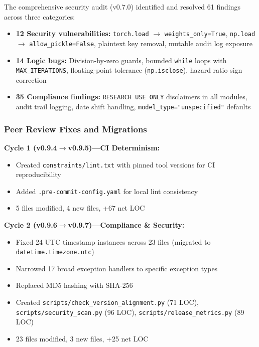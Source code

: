 \documentclass[10pt]{article}
\begin{document}
The comprehensive security audit (v0.7.0) identified and resolved 61 findings across three categories:
\begin{itemize}
  \item \textbf{12 Security vulnerabilities:} \texttt{torch.load} $\to$ \texttt{weights\_only=True}, \texttt{np.load} $\to$ \texttt{allow\_pickle=False}, plaintext key removal, mutable audit log exposure
  \item \textbf{14 Logic bugs:} Division-by-zero guards, bounded \texttt{while} loops with \texttt{MAX\_ITERATIONS}, floating-point tolerance (\texttt{np.isclose}), hazard ratio sign correction
  \item \textbf{35 Compliance findings:} \texttt{RESEARCH USE ONLY} disclaimers in all modules, audit trail logging, date shift handling, \texttt{model\_type="unspecified"} defaults
\end{itemize}

\subsubsection{Peer Review Fixes and Migrations}

\textbf{Cycle 1 (v0.9.4$\to$v0.9.5)---CI Determinism:}
\begin{itemize}
  \item Created \texttt{constraints/lint.txt} with pinned tool versions for CI reproducibility
  \item Added \texttt{.pre-commit-config.yaml} for local lint consistency
  \item 5 files modified, 4 new files, +67 net LOC
\end{itemize}

\textbf{Cycle 2 (v0.9.6$\to$v0.9.7)---Compliance \& Security:}
\begin{itemize}
  \item Fixed 24 UTC timestamp instances across 23 files (migrated to \texttt{datetime.timezone.utc})
  \item Narrowed 17 broad exception handlers to specific exception types
  \item Replaced MD5 hashing with SHA-256
  \item Created \texttt{scripts/check\_version\_alignment.py} (71 LOC), \texttt{scripts/security\_scan.py} (96 LOC), \texttt{scripts/release\_metrics.py} (89 LOC)
  \item 23 files modified, 3 new files, +25 net LOC
\end{itemize}
\end{document}
